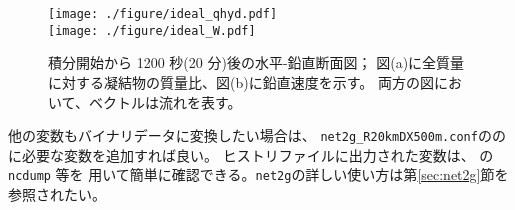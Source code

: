 \begin{figure}[t]
\begin{center}
  \texttt{[image: ./figure/ideal\_qhyd.pdf]}\\
  \texttt{[image: ./figure/ideal\_W.pdf]}\\
  \caption{積分開始から 1200 秒(20 分)後の水平-鉛直断面図；
           図(a)に全質量に対する凝結物の質量比、図(b)に鉛直速度を示す。
           両方の図において、ベクトルは流れを表す。}
  \label{fig_ideal}
\end{center}
\end{figure}

他の変数もバイナリデータに変換したい場合は、
\verb|net2g_R20kmDX500m.conf|のの に必要な変数を追加すれば良い。
ヒストリファイルに出力された変数は、{\netcdf} の\verb|ncdump| 等を
用いて簡単に確認できる。\verb|net2g|の詳しい使い方は第\ref{sec:net2g}節を参照されたい。
